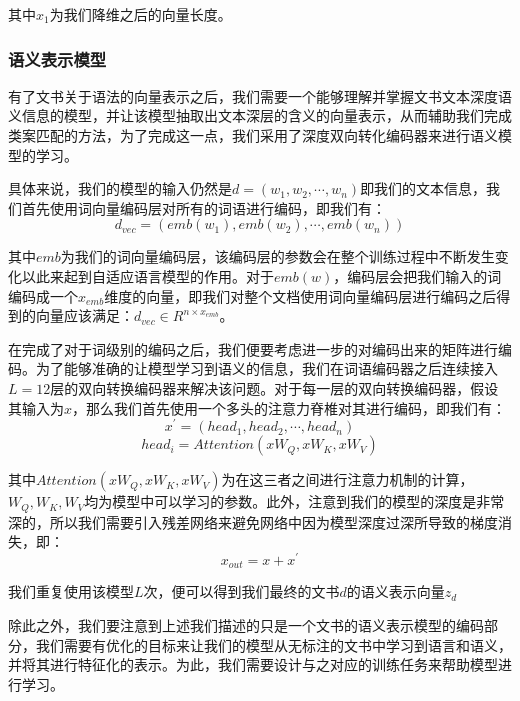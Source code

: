 其中$x_{1}$为我们降维之后的向量长度。

\subsubsection{语义表示模型}
有了文书关于语法的向量表示之后，我们需要一个能够理解并掌握文书文本深度语义信息的模型，并让该模型抽取出文本深层的含义的向量表示，从而辅助我们完成类案匹配的方法，为了完成这一点，我们采用了深度双向转化编码器来进行语义模型的学习。

具体来说，我们的模型的输入仍然是$ d=(w_1,w_2,⋯,w_n) $即我们的文本信息，我们首先使用词向量编码层对所有的词语进行编码，即我们有：
	\begin{equation}
		d_{vec}=(emb(w_{1}),emb(w_{2}),⋯,emb(w_{n}))
	\end{equation}
	
其中$emb$为我们的词向量编码层，该编码层的参数会在整个训练过程中不断发生变化以此来起到自适应语言模型的作用。对于$emb(w)$，编码层会把我们输入的词编码成一个$x_{emb}$维度的向量，即我们对整个文档使用词向量编码层进行编码之后得到的向量应该满足：$d_{vec} \in R^{n \times x_{emb}}$。

在完成了对于词级别的编码之后，我们便要考虑进一步的对编码出来的矩阵进行编码。为了能够准确的让模型学习到语义的信息，我们在词语编码器之后连续接入$L=12$层的双向转换编码器来解决该问题。对于每一层的双向转换编码器，假设其输入为$x$，那么我们首先使用一个多头的注意力脊椎对其进行编码，即我们有：
	\begin{equation}
		x^{'}=(head_{1},head_{2},⋯,head_{n})
	\end{equation}
	\begin{equation}
		head_{i} = Attention(xW_{Q},xW_{K},xW_{V})
	\end{equation}
	
其中$Attention(xW_{Q},xW_{K},xW_{V})$为在这三者之间进行注意力机制的计算，$W_{Q},W_{K},W_{V}$均为模型中可以学习的参数。此外，注意到我们的模型的深度是非常深的，所以我们需要引入残差网络来避免网络中因为模型深度过深所导致的梯度消失，即：
	\begin{equation}
		x_{out} = x + x^{'}
	\end{equation}

我们重复使用该模型$L$次，便可以得到我们最终的文书$d$的语义表示向量$z_{d}$

除此之外，我们要注意到上述我们描述的只是一个文书的语义表示模型的编码部分，我们需要有优化的目标来让我们的模型从无标注的文书中学习到语言和语义，并将其进行特征化的表示。为此，我们需要设计与之对应的训练任务来帮助模型进行学习。

